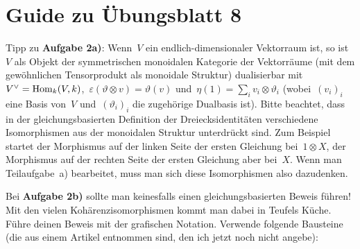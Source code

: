 \documentclass{uebblatt}
\begin{document}
\section*{Guide zu Übungsblatt 8}

Tipp zu \textbf{Aufgabe 2a)}: Wenn~$V$ ein endlich-dimensionaler Vektorraum ist,
so ist~$V$ als Objekt der symmetrischen monoidalen Kategorie der Vektorräume
(mit dem gewöhnlichen Tensorprodukt als monoidale Struktur) dualisierbar
mit~$V^\vee = \mathrm{Hom}_k(V,k)$,~$\varepsilon(\vartheta \otimes v) =
\vartheta(v)$ und~$\eta(1) = \sum_i v_i \otimes \vartheta_i$ (wobei~$(v_i)_i$
eine Basis von~$V$ und~$(\vartheta_i)_i$ die zugehörige Dualbasis ist).
Bitte beachtet, dass in der gleichungsbasierten Definition der
Dreiecksidentitäten verschiedene Isomorphismen aus der monoidalen Struktur
unterdrückt sind. Zum Beispiel startet der Morphismus auf der linken Seite der
ersten Gleichung bei~$1 \otimes X$, der Morphismus auf der rechten Seite der
ersten Gleichung aber bei~$X$. Wenn man Teilaufgabe~a) bearbeitet, muss man
sich diese Isomorphismen also dazudenken.

Bei \textbf{Aufgabe 2b)} sollte man keinesfalls einen gleichungsbasierten
Beweis führen! Mit den vielen Kohärenzisomorphismen kommt man dabei in Teufels
Küche. Führe deinen Beweis mit der grafischen Notation. Verwende folgende
Bausteine (die aus einem Artikel entnommen sind, den ich jetzt noch nicht
angebe):
\end{document}
